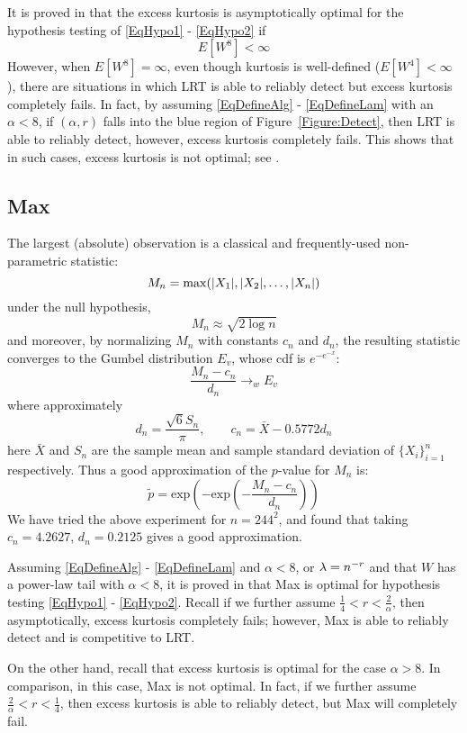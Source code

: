 It is proved in \citep{DJ04b} that the excess kurtosis is asymptotically optimal for the hypothesis testing of \eqref{EqHypo1} - \eqref{EqHypo2} if 
\[
E [W^8] < \infty
\]
However, when $E[W^8] = \infty$, even though kurtosis is well-defined ($E[W^4] < \infty$), there are situations in which LRT 
is able to reliably detect but excess kurtosis completely fails. In fact, by assuming \eqref{EqDefineAlg} - \eqref{EqDefineLam} 
with an $\alpha < 8$, if $(\alpha,r)$ falls into the blue region of Figure~\ref{Figure:Detect}, then LRT is able to reliably detect, 
however, excess kurtosis completely fails. This shows that in such cases, excess kurtosis is not optimal; see \citep{DJ04b}. 

\subsection{Max}
The largest (absolute) observation is a classical and frequently-used non-parametric statistic:
\[
M_n =  \mathrm{max}(|X_1|,|X_2|,\ldots, |X_n|)
\] 
under the null hypothesis, 
\[
M_n  \approx \sqrt{2 \log n}
\]
and moreover, by normalizing $M_n$ with constants $c_n$ and $d_n$, the resulting statistic 
converges to the Gumbel distribution $E_v$, whose cdf is $e^{-e^{-x}}$:
\[
\frac{M_n - c_n}{d_n}  \rightarrow_{w}    E_v
\]
where approximately
\[
d_n = \frac{\sqrt{6} S_n}{\pi}, \qquad  c_n = \bar{X} - 0.5772 d_n 
\]
here $\bar{X}$ and $S_n$ are the sample mean and sample standard deviation of $\{X_i\}_{i=1}^n$ respectively. 
Thus a good approximation of the $p$-value for $M_n$ is:
\[
\tilde{p} =  \mathrm{exp}(-\mathrm{exp}(-\frac{M_n - c_n}{d_n}))
\]
We have tried the above experiment for $n = 244^2$, and found that taking $c_n = 4.2627$, $d_n = 0.2125$ gives a good approximation.  

Assuming \eqref{EqDefineAlg} - \eqref{EqDefineLam} and $\alpha < 8$, or $\lambda = n^{-r}$ and that $W$ has a power-law tail 
with $\alpha < 8$, it is proved in \citep{DJ04b} that Max is optimal for hypothesis testing \eqref{EqHypo1} - \eqref{EqHypo2}. 
Recall if we further assume $\frac{1}{4} < r < \frac{2}{\alpha}$, then asymptotically, excess kurtosis completely fails; 
however, Max is able to reliably detect and is competitive to LRT. 

On the other hand, recall that excess kurtosis is optimal for the case $\alpha > 8$. In comparison, in this case, 
Max is not optimal. In fact, if we further assume $ \frac{2}{\alpha} < r < \frac{1}{4}$, then  excess kurtosis 
is able to reliably detect, but Max will completely fail. 

